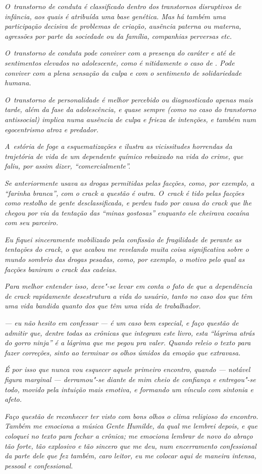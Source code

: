 \emph{O~transtorno de conduta é classificado dentro dos transtornos
disruptivos de infância, aos quais é atribuída uma base genética. Mas há
também uma participação decisiva de problemas de criação, ausência
paterna ou materna, agressões por parte da sociedade ou da família,
companhias perversas etc.}~

\emph{O~transtorno de conduta pode conviver com a presença do caráter e
até de sentimentos elevados no adolescente, como é nitidamente o caso de
. Pode conviver com a plena sensação da culpa e com o sentimento de
solidariedade humana.}~

\emph{O~transtorno de personalidade é melhor percebido ou diagnosticado
apenas mais tarde, além da fase da adolescência, e quase sempre (como no
caso do transtorno antissocial) implica numa ausência de culpa e frieza
de intenções, e também num egocentrismo atroz e predador.}~

\emph{A~estória de  foge a esquematizações e ilustra as vicissitudes
horrendas da trajetória de vida de um dependente químico rebaixado na
vida do crime, que faliu, por assim dizer, ``comercialmente''.}~

\emph{Se anteriormente  usava as drogas permitidas pelas facções,
como, por exemplo, a ``farinha branca'', com o crack a questão é outra.
O~crack é tido pelas facções como restolho de gente desclassificada, e
 perdeu tudo por causa do crack que lhe chegou por via da tentação das
``minas gostosas'' enquanto ele cheirava cocaína com seu parceiro.}~

\emph{Eu fiquei sinceramente mobilizado pela confissão de fragilidade de
 perante as tentações do crack, o que acabou me revelando muita coisa
significativa sobre o mundo sombrio das drogas pesadas, como, por
exemplo, o motivo pelo qual as facções baniram o crack das cadeias.}~

\emph{Para melhor entender isso, deve"-se levar em conta o fato de que a
dependência de crack rapidamente desestrutura a vida do usuário, tanto
no caso dos que têm uma vida bandida quanto dos que têm uma vida de
trabalhador.}~

\emph{ --- eu não hesito em confessar --- é um caso bem especial, e
faço questão de admitir que, dentre todas as crônicas que integram este
livro, esta ``lágrima atrás do gorro ninja'' é a lágrima que me pegou
pra valer. Quando releio o texto para fazer correções, sinto ao terminar
os olhos úmidos da emoção que extravasa.}~

\emph{É por isso que nunca vou esquecer aquele primeiro encontro, quando
 --- notável figura marginal --- derramou"-se diante de mim cheio de
confiança e entregou"-se todo, movido pela intuição mais emotiva, e
formando um vínculo com sintonia e afeto.}~

\emph{Faço questão de reconhecer ter visto com bons olhos o clima
religioso do encontro. Também me emociona a música Gente Humilde, da
qual me lembrei depois, e que coloquei no texto para fechar a crônica;
me emociona lembrar de novo do abraço tão forte, tão explosivo e tão
sincero que  me deu, num encerramento confessional da parte dele que
fez também, caro leitor, eu me colocar aqui de maneira intensa, pessoal
e confessional. ~}
